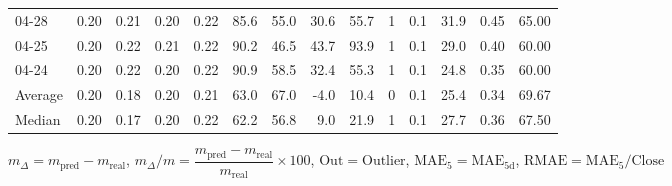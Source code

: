 \begin{threeparttable}
{\begin{tabular}{lrrrrrrrrrrrrr}
  04-28 &          0.20 &          0.21 &          0.20 &        0.22 &                85.6 &                55.0 &       30.6 &         55.7 &              1 &                 0.1 &             31.9 &            0.45 &                  65.00 \\
  04-25 &          0.20 &          0.22 &          0.21 &        0.22 &                90.2 &                46.5 &       43.7 &         93.9 &              1 &                 0.1 &             29.0 &            0.40 &                  60.00 \\
  04-24 &          0.20 &          0.22 &          0.20 &        0.22 &                90.9 &                58.5 &       32.4 &         55.3 &              1 &                 0.1 &             24.8 &            0.35 &                  60.00 \\
Average &          0.20 &          0.18 &          0.20 &        0.21 &                63.0 &                67.0 &       -4.0 &         10.4 &              0 &                 0.1 &             25.4 &            0.34 &                  69.67 \\
 Median &          0.20 &          0.17 &          0.20 &        0.22 &                62.2 &                56.8 &        9.0 &         21.9 &              1 &                 0.1 &             27.7 &            0.36 &                  67.50 \\
\bottomrule
\end{tabular}
}
\begin{tablenotes}\footnotesize
\item $m_\Delta=m_{\text{pred}}-m_{\text{real}}$,
$m_\Delta/m=\dfrac{m_{\text{pred}}-m_{\text{real}}}{m_{\text{real}}}\times100$,
$\mathrm{Out}=\text{Outlier}$,
$\mathrm{MAE}_5=\mathrm{MAE}_{5\text{d}}$,
$\mathrm{RMAE}=\mathrm{MAE}_5/\text{Close}$
\end{tablenotes}
\end{threeparttable}
\endgroup

